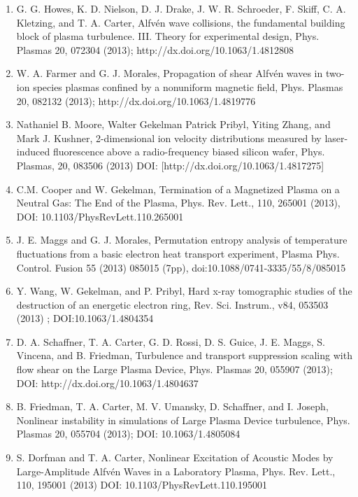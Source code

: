 \documentclass[11pt]{article}
\begin{document}
\begin{enumerate}
\item  G. G. Howes, K. D. Nielson, D. J. Drake, J. W. R. Schroeder, F. Skiff, C. A. Kletzing, and T. A. Carter, Alfv\'{e}n wave collisions, the fundamental building block of plasma turbulence. III. Theory for experimental design, Phys. Plasmas 20, 072304 (2013); http://dx.doi.org/10.1063/1.4812808

\item  W. A. Farmer and G. J. Morales, Propagation of shear Alfv\'{e}n waves in two-ion species plasmas confined by a nonuniform magnetic field, Phys. Plasmas 20, 082132 (2013); http://dx.doi.org/10.1063/1.4819776

\item   Nathaniel B. Moore, Walter Gekelman Patrick Pribyl, Yiting Zhang, and Mark J. Kushner, 2-dimensional ion velocity distributions measured by laser-induced fluorescence above a radio-frequency biased silicon wafer, Phys. Plasmas, 20, 083506 (2013) DOI: [http://dx.doi.org/10.1063/1.4817275]

\item  C.M. Cooper and W. Gekelman, Termination of a Magnetized Plasma on a Neutral Gas: The End of the Plasma, Phys. Rev. Lett., 110, 265001 (2013), DOI: 10.1103/PhysRevLett.110.265001

\item   J. E. Maggs and G. J. Morales, Permutation entropy analysis of temperature fluctuations from a basic electron heat transport experiment, Plasma Phys. Control. Fusion 55 (2013) 085015 (7pp), doi:10.1088/0741-3335/55/8/085015

\item  Y. Wang, W. Gekelman, and P. Pribyl, Hard x-ray tomographic studies of the destruction of an energetic electron ring, Rev. Sci. Instrum., v84, 053503 (2013) ; DOI:10.1063/1.4804354

\item   D. A. Schaffner, T. A. Carter, G. D. Rossi, D. S. Guice, J. E. Maggs, S. Vincena, and B. Friedman, Turbulence and transport suppression scaling with flow shear on the Large Plasma Device, Phys. Plasmas 20, 055907 (2013); DOI: http://dx.doi.org/10.1063/1.4804637

\item   B. Friedman, T. A. Carter, M. V. Umansky, D. Schaffner, and I. Joseph, Nonlinear instability in simulations of Large Plasma Device turbulence, Phys. Plasmas 20, 055704 (2013); DOI: 10.1063/1.4805084

\item  S. Dorfman and T. A. Carter, Nonlinear Excitation of Acoustic Modes by Large-Amplitude Alfv\'{e}n Waves in a Laboratory Plasma, Phys. Rev. Lett., 110, 195001 (2013) DOI: 10.1103/PhysRevLett.110.195001


\end{enumerate}
\end{document}
